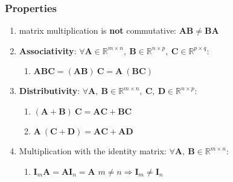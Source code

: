 \subsubsection{Properties}

\begin{enumerate}
    \item matrix multiplication is \textbf{not} commutative: $\bm{AB} \neq \bm{BA}$
    \hfill \cite{mfml/book/mml/Deisenroth-Faisal-Ong}

    \item \textbf{Associativity}: 
    $
        \forall 
        \bm{A} \in \mathbb{R}^{m\times n},\ 
        \bm{B} \in \mathbb{R}^{n\times p},\ 
        \bm{C} \in \mathbb{R}^{p\times q}
    $:
    
        \begin{enumerate}
            \item $\bm{ABC} = (\bm{AB})\ \bm{C} = \bm{A}\ (\bm{BC})$
            \hfill \cite{mfml/book/mml/Deisenroth-Faisal-Ong}
        \end{enumerate}

    \item \textbf{Distributivity}: 
    $
        \forall 
        \bm{A},\ \bm{B}\in \mathbb{R}^{m\times n},\ 
        \bm{C},\ \bm{D}\in \mathbb{R}^{n\times p}
    $:

        \begin{enumerate}
            \item $(\bm{A} + \bm{B})\ \bm{C} = \bm{AC} + \bm{BC}$
            \hfill \cite{mfml/book/mml/Deisenroth-Faisal-Ong}
            
            \item $\bm{A}\ (\bm{C} + \bm{D}) = \bm{AC} + \bm{AD}$
            \hfill \cite{mfml/book/mml/Deisenroth-Faisal-Ong}
        \end{enumerate}

    \item Multiplication with the identity matrix: 
    $
        \forall 
        \bm{A},\ \bm{B}\in \mathbb{R}^{m\times n}
    $:
        \begin{enumerate}
            \item $\bm{I}_m\bm{A} = \bm{AI}_n = \bm{A}$
            \hfill $m\neq n \Rightarrow \bm{I}_m \neq \bm{I}_n$
            \hfill \cite{mfml/book/mml/Deisenroth-Faisal-Ong}
        \end{enumerate}
\end{enumerate}















